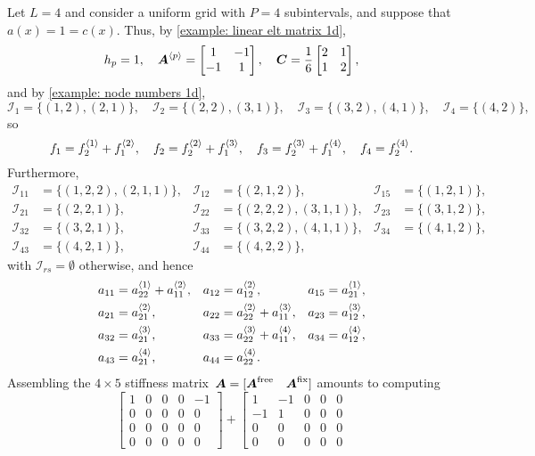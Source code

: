 \begin{example}\label{example: assemble A}
Let $L=4$ and consider a uniform grid with $P=4$ subintervals, and suppose 
that $a(x)=1=c(x)$.  Thus, by \cref{example: linear elt matrix 1d},
\[
h_p=1,\quad\boldsymbol{A}^{\langle p\rangle}=\begin{bmatrix}1&-1\\ -1&1\end{bmatrix},\quad
\boldsymbol{C}=\frac{1}{6}\begin{bmatrix}2&1\\ 1&2\end{bmatrix},
\]
and by \cref{example: node numbers 1d},
\[
\mathcal{I}_1=\{(1,2),(2,1)\},\quad
\mathcal{I}_2=\{(2,2),(3,1)\},\quad
\mathcal{I}_3=\{(3,2),(4,1)\},\quad
\mathcal{I}_4=\{(4,2)\},
\]
so
\[
f_1=f^{\langle1\rangle}_2+f^{\langle2\rangle}_1,\quad
f_2=f^{\langle2\rangle}_2+f^{\langle3\rangle}_1,\quad
f_3=f^{\langle3\rangle}_2+f^{\langle4\rangle}_1,\quad
f_4=f^{\langle4\rangle}_2.
\]
Furthermore,
\begin{align*}
\mathcal{I}_{11}&=\{(1,2,2),(2,1,1)\},&
\mathcal{I}_{12}&=\{(2,1,2)\},&
\mathcal{I}_{15}&=\{(1,2,1)\},\\
\mathcal{I}_{21}&=\{(2,2,1)\},&
\mathcal{I}_{22}&=\{(2,2,2),(3,1,1)\},&
\mathcal{I}_{23}&=\{(3,1,2)\},\\
\mathcal{I}_{32}&=\{(3,2,1)\},&
\mathcal{I}_{33}&=\{(3,2,2),(4,1,1)\},&
\mathcal{I}_{34}&=\{(4,1,2)\},\\
\mathcal{I}_{43}&=\{(4,2,1)\},&
\mathcal{I}_{44}&=\{(4,2,2)\},&&
\end{align*}
with $\mathcal{I}_{rs}=\emptyset$ otherwise, and hence
\begin{align*}
a_{11}&=a^{\langle1\rangle}_{22}+a^{\langle2\rangle}_{11},&
a_{12}&=a^{\langle2\rangle}_{12},&
a_{15}&=a^{\langle1\rangle}_{21},\\
a_{21}&=a^{\langle2\rangle}_{21},&
a_{22}&=a^{\langle2\rangle}_{22}+a^{\langle3\rangle}_{11},&
a_{23}&=a^{\langle3\rangle}_{12},\\
a_{32}&=a^{\langle3\rangle}_{21},&
a_{33}&=a^{\langle3\rangle}_{22}+a^{\langle4\rangle}_{11},&
a_{34}&=a^{\langle4\rangle}_{12},\\
a_{43}&=a^{\langle4\rangle}_{21},&
a_{44}&=a^{\langle4\rangle}_{22}.&&
\end{align*}
Assembling the $4\times5$ stiffness 
matrix~$\boldsymbol{A}=[\boldsymbol{A}^{\mathrm{free}}\quad\boldsymbol{A}^{\mathrm{fix}}]$ 
amounts to computing
\[
\left[
\begin{array}{cccc|c}1&0&0&0&-1\\0&0&0&0&0\\0&0&0&0&0\\0&0&0&0&0\end{array}
\right]+\left[
\begin{array}{cccc|c}1&-1&0&0&0\\-1&1&0&0&0\\0&0&0&0&0\\0&0&0&0&0\end{array}
\]
\end{example}
